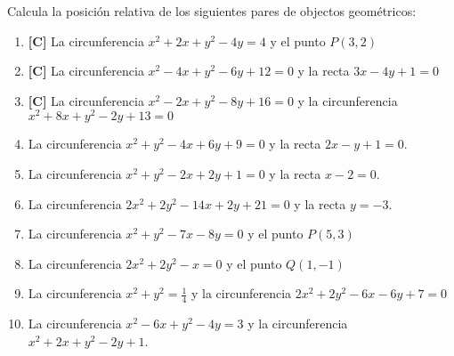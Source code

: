 \Exercicio Calcula la posición relativa de los siguientes pares de objectos geométricos:

\begin{enumerate}[topsep=0pt]
	\item \textbf{[C]} La circunferencia $x^2+2x+y^2-4y=4$ y el punto $P(3,2)$
	\item \textbf{[C]} La circunferencia $x^2-4x+y^2 - 6y +12 = 0$ y la recta $ 3x - 4y + 1 = 0$
	\item \textbf{[C]} La circunferencia $x^2 -2x + y^2 -8y +16 = 0$ y la circunferencia $x^2 + 8x + y^2 - 2y + 13=0$
	\item La circunferencia $x^2+y^2-4x+6y+9 = 0$ y la recta $2x-y+1=0$.
	\item La circunferencia $x^2+y^2-2x+2y+1 = 0$ y la recta $x - 2 = 0$.
	\item La circunferencia $2x^2+2y^2-14x+2y+21 = 0$ y la recta $y=-3$.
	\item La circunferencia $x^2+y^2-7x-8y=0$ y el punto $P(5,3)$
	\item La circunferencia $2x^2 +2y^2 -x = 0$ y el punto $Q(1,-1)$
	\item La circunferencia $x^2+y^2= \frac{1}{4}$ y la circunferencia $2x^2+2y^2-6x-6y+7=0$
	\item La circunferencia $x^2-6x+y^2-4y = 3$ y la circunferencia $x^2+2x+y^2-2y+1$.
\end{enumerate}


